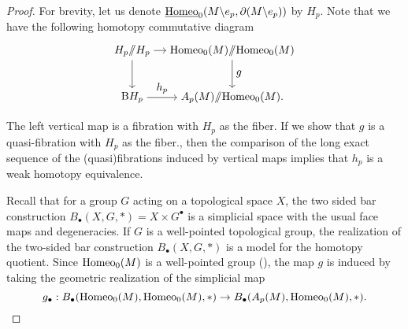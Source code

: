 \documentclass[a4paper]{amsart}
\theoremstyle{definition}
\theoremstyle{remark}
\newcommand{\hcoker}{/\!\!/}
\newcommand{\tH}{\text{\textnormal{Homeo}}}
\newcommand{\wH}{\underline{\text{\textnormal{Homeo}}}}
\numberwithin{equation}{section}
\begin{document}
\begin{proof}
For brevity, let us denote $\wH_{0}(M\backslash e_p,\partial(M\backslash e_p))$ by $H_p$. Note that we have the following homotopy commutative diagram
 \begin{equation}
 \begin{gathered}
 \begin{tikzpicture}[node distance=3.2cm, auto]
  \node (B) {$H_p\hcoker H_p$};
  \node (C) [below of= B, node distance=1.5cm] {$\mathrm{B}H_p$};  
    \node (E) [right of= B] {$\tH_0(M)\hcoker \tH_0(M) $};
  \node (F) [right of= C] {$A_p(M)\hcoker \tH_0(M).$};  
  \draw [->] (B) to node {$$}(E);
  \draw [->] (C) to node {$h_p$}(F);
  \draw [->] (B) to node {$$} (C);
  \draw [->] (E) to node {$g$} (F);
\end{tikzpicture}
\end{gathered}
\end{equation}
The left vertical map is a fibration with $H_p$ as the fiber. If we show that $g$ is a quasi-fibration with $H_p$ as the fiber., then the comparison of the long exact sequence of the (quasi)fibrations induced by vertical maps implies that $h_p$ is a weak homotopy equivalence.

Recall that for a group $G$ acting on a topological space $X$, the two sided bar construction $B_{\bullet}(X,G,*)=X\times G^{\bullet}$ is a simplicial space with the usual face maps and degeneracies. If $G$ is a well-pointed topological group, the realization of the two-sided bar construction $B_{\bullet}(X,G,*)$ is a model for the homotopy quotient. Since $\tH_0(M)$ is a well-pointed group (\cite{edwards1971deformations}), the map $g$ is induced by taking the geometric realization of the simplicial map
\[
g_{\bullet}: B_{\bullet}(\tH_0(M),\tH_0(M),*)\to B_{\bullet}(A_p(M),\tH_0(M),*).
\]


\end{proof}
\end{document}

